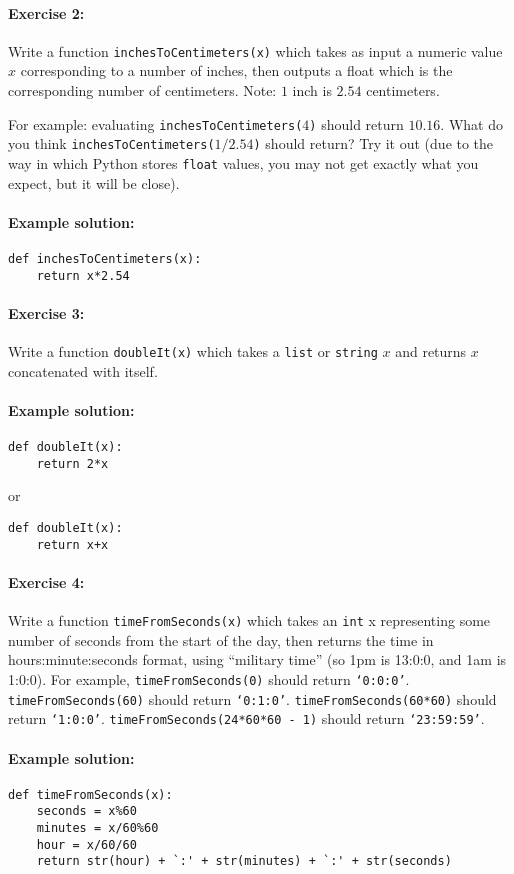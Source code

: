 \documentclass[11pt]{article}
\begin{document}
\paragraph{Exercise 2:}
Write a function \texttt{inchesToCentimeters(x)} which takes as input a
numeric value $x$ corresponding to a number of inches, then outputs a
float which is the corresponding number of centimeters.  Note: $1$
inch is $2.54$ centimeters.

For example: evaluating \texttt{inchesToCentimeters($4$)} should return
$10.16$.  What do you think \texttt{inchesToCentimeters($1/2.54$)}
should return?
Try it out (due to the way in which Python stores \texttt{float}
values, you may not get exactly what you expect, but it will be
close).

\paragraph{Example solution:}
\begin{verbatim}
def inchesToCentimeters(x):
    return x*2.54
\end{verbatim}

\paragraph{Exercise 3:}
Write a function \texttt{doubleIt(x)} which takes a \texttt{list} or
\texttt{string} $x$ and returns $x$ concatenated with itself.

\paragraph{Example solution:}
\begin{verbatim}
def doubleIt(x):
    return 2*x
\end{verbatim}

or

\begin{verbatim}
def doubleIt(x):
    return x+x
\end{verbatim}

\paragraph{Exercise 4:}
Write a function \texttt{timeFromSeconds(x)} which takes an
\texttt{int} x representing some number of seconds from the start of
the day, then returns the time in hours:minute:seconds format, using
``military time'' (so 1pm is 13:0:0, and 1am is 1:0:0). For example,
\texttt{timeFromSeconds(0)} should
return \texttt{`0:0:0'}. \texttt{timeFromSeconds(60)} should
return \texttt{`0:1:0'}. \texttt{timeFromSeconds(60*60)} should
return \texttt{`1:0:0'}. \texttt{timeFromSeconds(24*60*60 - 1)} should
return \texttt{`23:59:59'}.

\paragraph{Example solution:}
\begin{verbatim}
def timeFromSeconds(x):
    seconds = x%60
    minutes = x/60%60
    hour = x/60/60
    return str(hour) + `:' + str(minutes) + `:' + str(seconds)
\end{verbatim}
\end{document}
